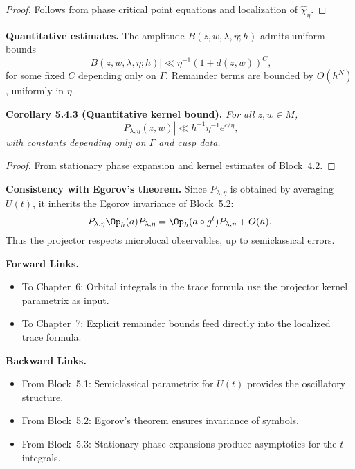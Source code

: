 \begin{proof}
Follows from phase critical point equations and localization of $\widehat{\chi}_\eta$.
\end{proof}

\medskip

\noindent\textbf{Quantitative estimates.}
The amplitude $B(z,w,\lambda,\eta;h)$ admits uniform bounds
\[
  |B(z,w,\lambda,\eta;h)| \ll \eta^{-1}(1+d(z,w))^C,
\]
for some fixed $C$ depending only on $\Gamma$.
Remainder terms are bounded by $O(h^N)$,
uniformly in $\eta$.

\medskip

\noindent\textbf{Corollary 5.4.3 (Quantitative kernel bound).}
\emph{For all $z,w\in M$,}
\[
  |P_{\lambda,\eta}(z,w)| \ll h^{-1} \eta^{-1} e^{c/\eta},
\]
\emph{with constants depending only on $\Gamma$ and cusp data.}

\begin{proof}
From stationary phase expansion and kernel estimates of Block~4.2.
\end{proof}

\medskip

\noindent\textbf{Consistency with Egorov’s theorem.}
Since $P_{\lambda,\eta}$ is obtained by averaging $U(t)$,
it inherits the Egorov invariance of Block~5.2:
\[
  P_{\lambda,\eta} \Op_h(a) P_{\lambda,\eta}
  = \Op_h(a\circ g^t)P_{\lambda,\eta} + O(h).
\]
Thus the projector respects microlocal observables,
up to semiclassical errors.

\medskip

\noindent\textbf{Forward Links.}
\begin{itemize}
  \item To Chapter~6: Orbital integrals in the trace formula use the projector kernel parametrix as input.
  \item To Chapter~7: Explicit remainder bounds feed directly into the localized trace formula.
\end{itemize}

\medskip

\noindent\textbf{Backward Links.}
\begin{itemize}
  \item From Block~5.1: Semiclassical parametrix for $U(t)$ provides the oscillatory structure.
  \item From Block~5.2: Egorov’s theorem ensures invariance of symbols.
  \item From Block~5.3: Stationary phase expansions produce asymptotics for the $t$-integrals.
\end{itemize}

